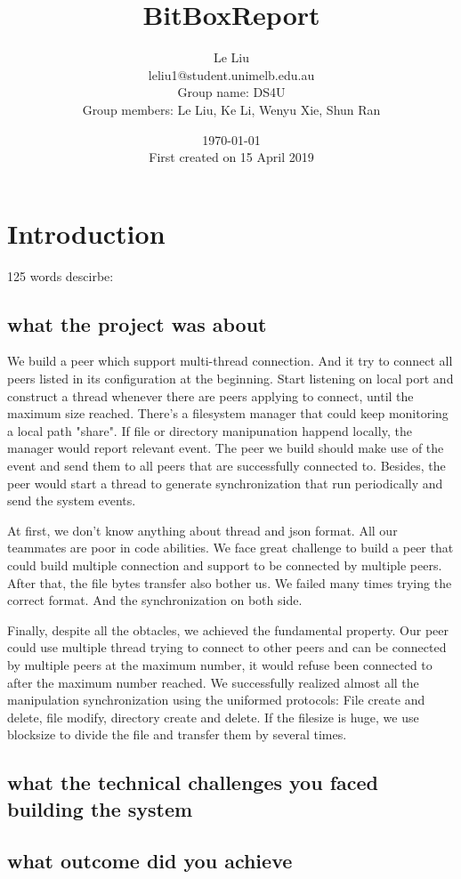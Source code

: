 \documentclass[10pt,a4paper]{report}
\author{Le Liu \\leliu1@student.unimelb.edu.au \\Group name: DS4U \\ Group members: Le Liu, Ke Li, Wenyu Xie, Shun Ran}
\date{\today \\ First created on 15 April 2019}
\title{BitBoxReport}
\begin{document}
\maketitle
\tableofcontents


\chapter{Introduction}
125 words descirbe: 
\section{what the project was about}
We build a peer which support multi-thread connection. And it try to connect all peers listed in its configuration at the beginning. Start listening on local port and construct a thread whenever there are peers applying to connect, until the maximum size reached. There's a filesystem manager that could keep monitoring a local path "share". If file or directory manipunation happend locally, the manager would report relevant event. The peer we build should make use of the event and send them to all peers that are successfully connected to. Besides, the peer would start a thread to generate synchronization that run periodically and send the system events. 

At first, we don't know anything about thread and json format. All our teammates are poor in code abilities. We face great challenge to build a peer that could build multiple connection and support to be connected by multiple peers. After that, the file bytes transfer also bother us. We failed many times trying the correct format. And the synchronization on both side.

Finally, despite all the obtacles, we achieved the fundamental property. Our peer could use multiple thread trying to connect to other peers and can be connected by multiple peers at the maximum number, it would refuse been connected to after the maximum number reached. We successfully realized almost all the manipulation synchronization using the uniformed protocols: File create and delete, file modify, directory create and delete. If the filesize is huge, we use blocksize to divide the file and transfer them by several times. 
\section{what the technical challenges you faced building the system}
\section{what outcome did you achieve}
\end{document}

